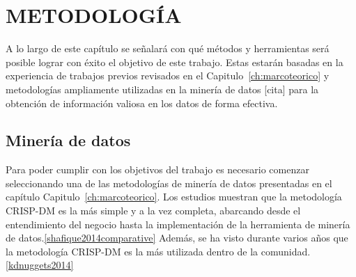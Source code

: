 \chapter{METODOLOGÍA}
\label{ch:metodologia}

A lo largo de este capítulo se señalará con qué métodos y herramientas será posible lograr con éxito el objetivo de este trabajo. Estas estarán basadas en la experiencia de trabajos previos revisados en el Capitulo~\ref{ch:marcoteorico} y metodologías ampliamente utilizadas en la minería de datos [cita] para la obtención de información valiosa en los datos de forma efectiva.

\section{Minería de datos}

Para poder cumplir con los objetivos del trabajo es necesario comenzar seleccionando una de las metodologías de minería de datos presentadas en el capítulo Capitulo~\ref{ch:marcoteorico}. Los estudios muestran que la metodología CRISP-DM es la más simple y a la vez completa, abarcando desde el entendimiento del negocio hasta la implementación de la herramienta de minería de datos.\ref{shafique2014comparative}
Además, se ha visto durante varios años que la metodología CRISP-DM es la más utilizada dentro de la comunidad.\ref{kdnuggets2014}

